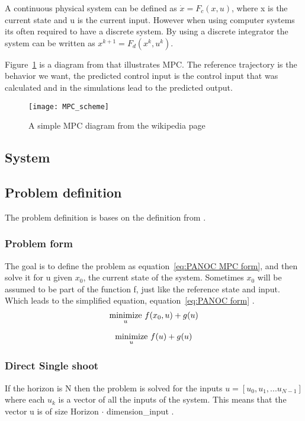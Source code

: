 	A continuous physical system can be defined as $\dot{x}=F_c(x,u)$, where x is the current state and u is the current input. However when using computer systems its often required to have a discrete system. By using a discrete integrator the system can be written as $x^{k+1}=F_d(x^{k},u^{k})$. 
	
	Figure~\ref{fig:MPC diagram} is a diagram from \cite{Wikipedia} that illustrates MPC. The reference trajectory is the behavior we want, the predicted control input is the control input that was calculated and in the simulations lead to the predicted output.
	\begin{figure}[h]
		\centering
		\texttt{[image: MPC\_scheme]}
		\caption{A simple MPC diagram from the wikipedia page \cite{Wikipedia}}
		\label{fig:MPC diagram}
	\end{figure}
			
	\subsection{System}
		
	\subsection{Problem definition}
	The problem definition is bases on the definition from \cite{Diehl2005}.
		\subsubsection{Problem form}
			The goal is to define the problem as equation~\ref{eq:PANOC MPC form}, and then solve it for u given $x_0$, the current state of the system. Sometimes $x_0$ will be assumed to be part of the function f, just like the reference state and input. Which leads to the simplified equation, equation~\ref{eq:PANOC form} .
			\begin{equation}
				\underset{u}{\operatorname*{minimize}} \  f(x_0,u) + g(u)
				\label{eq:PANOC MPC form}
			\end{equation}
			
			\begin{equation}
				\underset{u}{\operatorname*{minimize}} \  f(u) + g(u)
				\label{eq:PANOC form}
			\end{equation}
		\subsubsection{Direct Single shoot}
			If the horizon is N then the problem is solved for the inputs $u=[u_0,u_1,... u_{N-1}]$ where each $u_k$ is a vector of all the inputs of the system. This means that the vector u is of size Horizon $\cdot$ dimension\_input .
			
